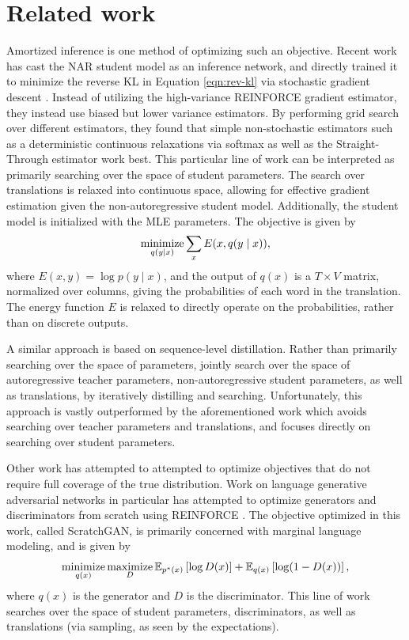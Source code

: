 \documentclass[11pt]{article}
\begin{document}
\section{Related work}
Amortized inference is one method of optimizing such an objective.
Recent work has cast the NAR student model as an inference network,
and directly trained it to minimize the reverse KL in Equation \ref{eqn:rev-kl}
via stochastic gradient descent \citep{engine}.
Instead of utilizing the high-variance REINFORCE gradient estimator,
they instead use biased but lower variance estimators.
By performing grid search over different estimators,
they found that simple non-stochastic estimators such as a deterministic continuous relaxations
via softmax as well as the Straight-Through estimator work best.
This particular line of work can be interpreted as primarily searching over
the space of student parameters.
The search over translations is relaxed into continuous space,
allowing for effective gradient estimation given the non-autoregressive student model.
Additionally, the student model is initialized with the MLE parameters.
The objective is given by
\begin{equation}
\operatorname*{minimize}_{q(y \mid x)} \sum_x E(x, q(y \mid x)),
\end{equation}
where $E(x, y) = \log p(y \mid x)$, and the output of $q(x)$ is a $T \times V$ matrix,
normalized over columns, giving the probabilities of each word in the translation.
The energy function $E$ is relaxed to directly operate on the probabilities,
rather than on discrete outputs.

A similar approach is based on sequence-level distillation.
Rather than primarily searching over the space of parameters,
\citet{emnat} jointly search over the space of autoregressive teacher parameters,
non-autoregressive student parameters, as well as translations,
by iteratively distilling and searching.
Unfortunately, this approach is vastly outperformed by the aforementioned work
which avoids searching over teacher parameters and translations,
and focuses directly on searching over student parameters.

Other work has attempted to attempted to optimize objectives that do not require
full coverage of the true distribution.
Work on language generative adversarial networks in particular has attempted to
optimize generators and discriminators from scratch using REINFORCE \citet{scratchgan}.
The objective optimized in this work, called ScratchGAN, is primarily concerned with
marginal language modeling, and is given by
\begin{equation}
\operatorname*{minimize}_{q(x)} \operatorname*{maximize}_{D} \mathbb{E}_{p^*(x)}\left[\log D(x)\right] + \mathbb{E}_{q(x)}\left[\log (1-D(x))\right],
\end{equation}
where $q(x)$ is the generator and $D$ is the discriminator.
This line of work searches over the space of student parameters, discriminators,
as well as translations (via sampling, as seen by the expectations).
\end{document}
